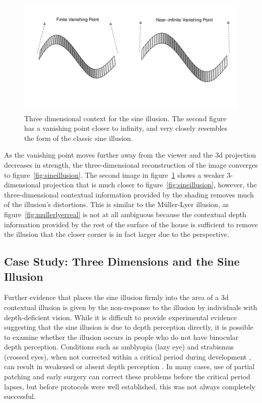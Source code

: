 \documentclass[11pt]{isuthesis}\usepackage[]{graphicx}\usepackage[]{color}
\begin{document}
\begin{figure}\centering
\includegraphics[keepaspectratio=TRUE,width=6in, trim=0in 1.25in 0in .5in]{fig-sinedemo2}
\caption{Three dimensional context for the sine illusion. The second figure has a vanishing point closer to infinity, and very closely resembles the form of the classic sine illusion.}\label{fig:sineillusion3d}
\end{figure}

As the vanishing point moves further away from the viewer and the 3d projection decreases in strength, the three-dimensional reconstruction of the image converges to figure~\ref{fig:sineillusion}. The second image in figure~\ref{fig:sineillusion3d} shows a weaker 3-dimensional projection that is much closer to figure~\ref{fig:sineillusion}, however, the three-dimensional contextual information provided by the shading removes much of the illusion's distortions. This is similar to the M\"uller-Lyer illusion, as figure~\ref{fig:mullerlyerreal} is not at all ambiguous because the contextual depth information provided by the rest of the surface of the house is sufficient to remove the illusion that the closer corner is in fact larger due to the perspective.

\subsection{Case Study: Three Dimensions and the Sine Illusion}
Further evidence that places the sine illusion firmly into the area of a 3d contextual illusion is given by the non-response to the illusion by individuals with depth-deficient vision. While it is difficult to provide experimental evidence suggesting that the sine illusion is due to depth perception directly, it is possible to examine whether the illusion occurs in people who do not have binocular depth perception. Conditions such as amblyopia (lazy eye) and strabismus (crossed eyes), when not corrected within a critical period during development \citep{DepthCriticalPeriod}, can result in weakened or absent depth perception \citep{StrabismusDepthPerception, BinocularDepthPerception, BinocularAmblyopia}. In many cases, use of partial patching and early surgery can correct these problems before the critical period lapses, but before protocols were well established, this was not always completely successful. 
\end{document}
